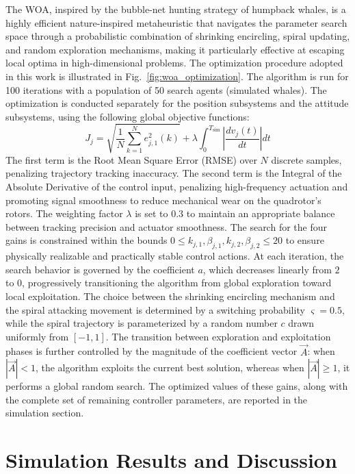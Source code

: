 The WOA, inspired by the bubble-net hunting strategy of humpback whales, is a highly efficient nature-inspired metaheuristic that navigates the parameter search space through a probabilistic combination of shrinking encircling, spiral updating, and random exploration mechanisms, making it particularly effective at escaping local optima in high-dimensional problems. The optimization procedure adopted in this work is illustrated in Fig.~\ref{fig:woa_optimization}. The algorithm is run for 100 iterations with a population of 50 search agents (simulated whales). The optimization is conducted separately for the position subsystems and the attitude subsystems, using the following global objective functions:
\begin{equation}
    J_j = \sqrt{\frac{1}{N} \sum_{k=1}^{N} e_{j,1}^2(k)} + \lambda \int_{0}^{T_{\text{sim}}} \left| \frac{dv_j(t)}{dt} \right| dt
    \label{eq:global_cost_function_quad}
\end{equation}
The first term is the Root Mean Square Error (RMSE) over $N$ discrete samples, penalizing trajectory tracking inaccuracy. The second term is the Integral of the Absolute Derivative of the control input, penalizing high-frequency actuation and promoting signal smoothness to reduce mechanical wear on the quadrotor's rotors. The weighting factor $\lambda$ is set to $0.3$ to maintain an appropriate balance between tracking precision and actuator smoothness. The search for the four gains is constrained within the bounds $0 \leq k_{j,1}, \beta_{j,1}, k_{j,2}, \beta_{j,2} \leq 20$ to ensure physically realizable and practically stable control actions. At each iteration, the search behavior is governed by the coefficient $a$, which decreases linearly from $2$ to $0$, progressively transitioning the algorithm from global exploration toward local exploitation. The choice between the shrinking encircling mechanism and the spiral attacking movement is determined by a switching probability $\varsigma = 0.5$, while the spiral trajectory is parameterized by a random number $c$ drawn uniformly from $[-1, 1]$. The transition between exploration and exploitation phases is further controlled by the magnitude of the coefficient vector $\vec{A}$: when $|\vec{A}| < 1$, the algorithm exploits the current best solution, whereas when $|\vec{A}| \geq 1$, it performs a global random search. The optimized values of these gains, along with the complete set of remaining controller parameters, are reported in the simulation section.

\section{Simulation Results and Discussion}
\label{sec:sim_results_quadrotor}

